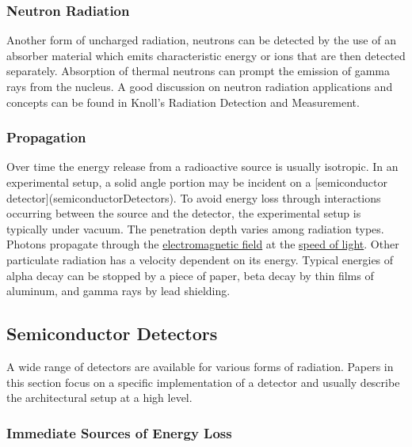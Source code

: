 \documentclass[12pt]{article}
\begin{document}
\begin{doublespacing}

\subsubsection{Neutron Radiation}
Another form of uncharged radiation, neutrons can be detected by the use of an absorber material which emits characteristic energy or ions that are then detected separately.
Absorption of thermal neutrons can prompt the emission of gamma rays from the nucleus.
A good discussion on neutron radiation applications and concepts can be found in Knoll's Radiation Detection and Measurement.

\subsubsection{Propagation}
Over time the energy release from a radioactive source is usually isotropic. In an experimental setup, a solid angle portion may be incident on a [semiconductor detector](semiconductorDetectors). To avoid energy loss through interactions occurring between the source and the detector, the experimental setup is typically under vacuum. 
The penetration depth varies among radiation types. Photons propagate through the \href{https://en.wikipedia.org/wiki/Electromagnetic_field}{electromagnetic field} at the \href{https://en.wikipedia.org/wiki/Speed_of_light}{speed of light}. Other particulate radiation has a velocity dependent on its energy. Typical energies of alpha decay can be stopped by a piece of paper, beta decay by thin films of aluminum, and gamma rays by lead shielding.


\subsection{Semiconductor Detectors}   %
A wide range of detectors are available for various forms of radiation.
Papers in this section focus on a specific implementation of a detector and usually describe the architectural setup at a high level.

\subsubsection{Immediate Sources of Energy Loss}


\end{doublespacing}
\end{document}
